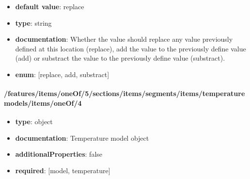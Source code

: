 \begin{itemize}\item {\bf default value}: replace
\item {\bf type}: string
\item {\bf documentation}: Whether the value should replace any value previously defined at this location (replace), add the value to the previously define value (add) or substract the value to the previously define value (substract).
\item {\bf enum}: [replace, add, substract]\end{itemize}\paragraph{/features/items/oneOf/5/sections/items/segments/items/temperature models/items/oneOf/4}
\begin{itemize}\item {\bf type}: object
\item {\bf documentation}: Temperature model object
\item {\bf additionalProperties}: false
\item {\bf required}: [model, temperature]\end{itemize}
